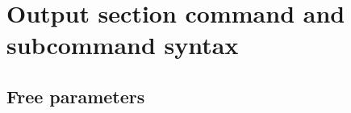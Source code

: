 \section{Output section command and subcommand syntax\label{sec:output-syntax}}

\subsection{Free parameters\label{sec:InputFileFormat}}

